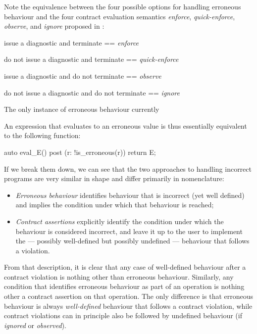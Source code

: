 Note the equivalence between the four possible options for handling erroneous behaviour and the four contract evaluation semantics \emph{enforce}, \emph{quick-enforce}, \emph{observe}, and \emph{ignore} proposed in \cite{P2900R13}:

\begin{center}
issue a diagnostic and terminate == \emph{enforce}

do not issue a diagnostic and terminate == \emph{quick-enforce}

issue a diagnostic and do not terminate == \emph{observe}

do not issue a diagnostic and do not terminate == \emph{ignore}
\end{center}

The only instance of erroneous behaviour currently 

An expression  that evaluates to an erroneous value is thus essentially equivalent to the following function:

\begin{codeblock}
auto eval_E() 
post (r: !is_erroneous(r)) { 
  return E;
}
\end{codeblock}

If we break them down, we can see that the two approaches to handling incorrect programs are very similar in shape and differ primarily in nomenclature:
\begin{itemize}
\item{\emph{Erroneous behaviour} identifies behaviour that is incorrect (yet well defined) and implies the condition under which that behaviour is reached;}
\item{\emph{Contract assertions} explicitly identify the condition under which the behaviour is considered incorrect, and leave it up to the user to implement the --- possibly well-defined but possibly undefined --- behaviour that follows a violation.}
\end{itemize}
From that description, it is clear that any case of well-defined behaviour after a contract violation is nothing other than erroneous behaviour.  Similarly, any condition that identifies erroneous behaviour as part of an operation is nothing other a contract assertion on that operation. The only difference is that erroneous behaviour is always \emph{well-defined} behaviour that follows a contract violation, while contract violations can in principle also be followed by undefined behaviour (if \emph{ignored} or \emph{observed}).

